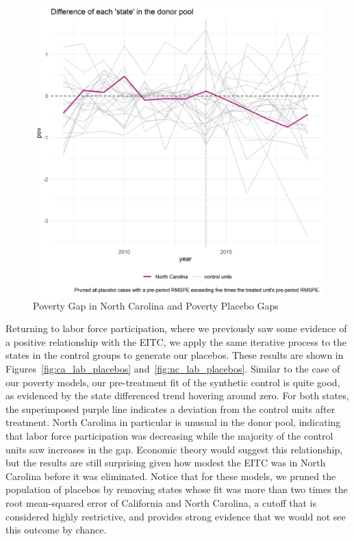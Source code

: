 \documentclass{article}
\begin{document}
\begin{figure}[H]
    \caption{Poverty Gap in North Carolina and Poverty Placebo Gaps}
    \begin{center}
        \includegraphics[width=.85\textwidth]{nc_pov_placebos}
    \end{center}
    \label{fig:nc_pov_placebos}{}
\end{figure}

Returning to labor force participation, where we previously saw some evidence of a positive relationship with the EITC, we apply the same iterative process to the states in the control groups to generate our placebos. These results are shown in Figures~\ref{fig:ca_lab_placebos} and~\ref{fig:nc_lab_placebos}. Similar to the case of our poverty models, our pre-treatment fit of the synthetic control is quite good, as evidenced by the state differenced trend hovering around zero. For both states, the superimposed purple line indicates a deviation from the control units after treatment. North Carolina in particular is unusual in the donor pool, indicating that labor force participation was decreasing while the majority of the control units saw increases in the gap. Economic theory would suggest this relationship, but the results are still surprising given how modest the EITC was in North Carolina before it was eliminated. Notice that for these models, we pruned the population of placebos by removing states whose fit was more than two times the root mean-squared error of California and North Carolina, a cutoff that is considered highly restrictive, and provides strong evidence that we would not see this outcome by chance.
\end{document}
